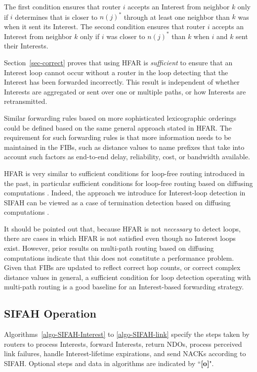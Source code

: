 \documentclass{ancs15-alternate}
\begin{document}
The first condition ensures that router $i$ accepts an Interest from neighbor $k$ only if $i$ determines that is closer to $n(j)^*$ 
through at least one neighbor than $k$ was when it sent its Interest.
The second condition ensures that router $i$ accepts an Interest from neighbor $k$ only if $i$ was closer to  $n(j)^*$  than $k$ when $i$ and $k$ sent their Interests. 

Section~\ref{sec-correct} proves that using HFAR is {\em sufficient} to ensure that an Interest loop  cannot occur without a router in the loop detecting that the Interest has been forwarded incorrectly. This result is independent of whether Interests are aggregated or sent over one or multiple paths, or  how Interests are retransmitted.

Similar  forwarding rules based on more sophisticated lexicographic orderings
could be defined based on the same general approach  stated in HFAR.
The requirement for such forwarding rules is that more information needs to be maintained in the FIBs, such as distance values to name prefixes that take into account such factors as end-to-end delay, reliability, cost, or bandwidth available. 

HFAR is very similar to sufficient conditions for loop-free routing introduced in the past, in particular sufficient conditions for loop-free routing based on diffusing computations \cite{dual, vutukury, dual-patent}. Indeed,  the approach we introduce  for Interest-loop detection in SIFAH
can be viewed as a case of  termination detection based on  diffusing computations \cite{diffuse}.

It should be pointed out   that, because HFAR is not {\em necessary} to detect loops, there are cases in which HFAR  is not satisfied even though no Interest loops exist.  However, prior results on  multi-path routing based on 
diffusing computations \cite{dual2} indicate that this does not constitute a performance problem.
Given that FIBs are updated to reflect correct hop counts, or correct complex distance values in general,
a sufficient condition for loop detection operating with multi-path routing is a good 
baseline for an Interest-based forwarding strategy.  


\subsection{SIFAH Operation}

Algorithms~\ref{algo-SIFAH-Interest}  to \ref{algo-SIFAH-link} specify 
the steps taken by  routers to process Interests, forward Interests, return NDOs, process perceived link failures, handle Interest-lifetime expirations, and 
send NACKs according to SIFAH.  Optional steps  and data in algorithms are indicated by ``{\bf [o]}".
\end{document}

